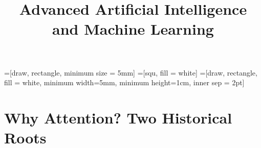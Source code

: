 




\newcommand{\ques}{\textbf{\textcolor{red}{Question:  }}}
\newcommand{\blu}[1]{\textcolor{blue}{#1}}
\newcommand{\org}[1]{\textcolor{orange}{#1}}
\newcommand{\citebutton}[2]{\beamergotobutton{\href{#2}{#1}}}
\def\rmA{{\mathbf{A}}}
\def\rmE{{\mathbf{E}}}
\def\rmR{{\mathbf{R}}}
\def\rmU{{\mathbf{U}}}
\def\rmW{{\mathbf{W}}}
=[draw, rectangle, minimum size = 5mm]
=[squ, fill = white]
=[draw, rectangle, fill = white, minimum width=5mm, minimum height=1cm, inner sep = 2pt]

\newcommand{\titlefigure}{figure/transformer.png}
\newcommand{\learninggoals}{
  \item Attention's two historical roots: Neural Turing Machines and the encoder-decoder bottleneck
  \item Tokenization: word, subword, and character level
  \item Self-attention, multi-head attention, and positional encoding
  \item The Transformer block and decoder: residuals, layer norm, masking, cross-attention
  \item Parameter count, efficient attention, and Transformer-XL
  \item Encoder-only, decoder-only, and encoder-decoder families
}

\title{Advanced Artificial Intelligence and Machine Learning}
\date{}





\section{Why Attention? Two Historical Roots}


